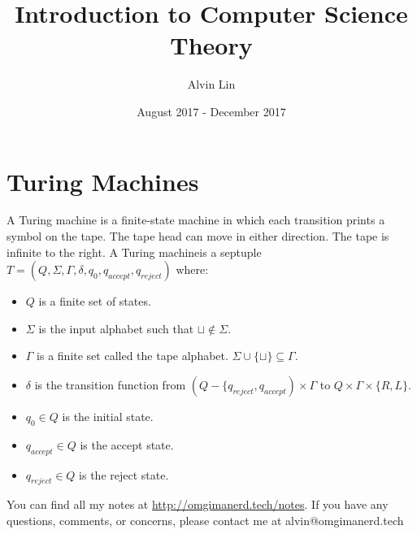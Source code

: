 \documentclass{math}
\title{Introduction to Computer Science Theory}
\author{Alvin Lin}
\date{August 2017 - December 2017}
\begin{document}
\maketitle

\section*{Turing Machines}
A Turing machine is a finite-state machine in which each transition prints a
symbol on the tape. The tape head can move in either direction. The tape is
infinite to the right. A Turing machineis a septuple \( T =
(Q,\Sigma,\Gamma,\delta,q_0,q_{accept},q_{reject}) \) where:
\begin{itemize}
  \item \( Q \) is a finite set of states.
  \item \( \Sigma \) is the input alphabet such that \( \sqcup\notin\Sigma \).
  \item \( \Gamma \) is a finite set called the tape alphabet.
  \( \Sigma\cup\{\sqcup\}\subseteq\Gamma \).
  \item \( \delta \) is the transition function from
    \( (Q-\{q_{reject},q_{accept})\times\Gamma \) to
    \( Q\times\Gamma\times\{R,L\} \).
  \item \( q_0\in Q \) is the initial state.
  \item \( q_{accept}\in Q \) is the accept state.
  \item \( q_{reject}\in Q \) is the reject state.
\end{itemize}

\begin{center}
  You can find all my notes at \url{http://omgimanerd.tech/notes}. If you have
  any questions, comments, or concerns, please contact me at
  alvin@omgimanerd.tech
\end{center}
\end{document}
